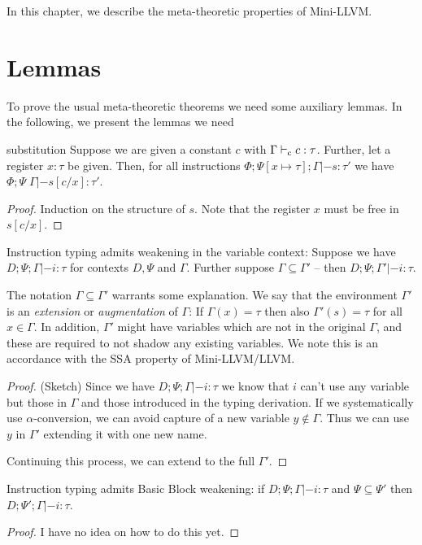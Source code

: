 \documentclass[a4paper, oneside, 10pt, draft]{memoir}
\begin{document}
In this chapter, we describe the meta-theoretic properties of
Mini-LLVM.

\section{Lemmas}

To prove the usual meta-theoretic theorems we need some auxiliary
lemmas. In the following, we present the lemmas we need

\begin{lem}{substitution}
  \label{lem:substitution}
  Suppose we are given a constant $c$ with $\Gamma |-_{\mathrm{c}} c :
  \tau$. Further, let a register $x : \tau$ be given. Then, for all
  instructions $\Phi;\Psi[x \mapsto \tau];\Gamma |- s : \tau'$ we have
  $\Phi;\Psi\;\Gamma |- s[c/x] : \tau'$.
\end{lem}
\begin{proof}
  Induction on the structure of $s$. Note that the register $x$ must
  be free in $s[c/x]$.
\end{proof}

\begin{lem}
  \label{lem:weaken-gamma}
  Instruction typing admits weakening in the variable context: Suppose
  we have $D;\Psi;\Gamma |- i : \tau$ for contexts $D, \Psi$ and
  $\Gamma$. Further suppose $\Gamma \subseteq \Gamma'$ -- then
  $D;\Psi;\Gamma' |- i : \tau$.
\end{lem}
\begin{rem}
  The notation $\Gamma \subseteq \Gamma'$ warrants some
  explanation. We say that the environment $\Gamma'$ is an
  \emph{extension} or \emph{augmentation} of $\Gamma$: If $\Gamma(x) =
  \tau$ then also $\Gamma'(s) = \tau$ for all $x \in \Gamma$. In
  addition, $\Gamma'$ might have variables which are not in the
  original $\Gamma$, and these are required to not shadow any existing
  variables. We note this is an accordance with the SSA property of
  Mini-LLVM/LLVM.
\end{rem}
\begin{proof}(Sketch)
  Since we have $D;\Psi;\Gamma |- i : \tau$ we know that $i$ can't use
  any variable but those in $\Gamma$ and those introduced in the
  typing derivation. If we systematically use $\alpha$-conversion, we
  can avoid capture of a new variable $y \not \in \Gamma$. Thus we can
  use $y$ in $\Gamma'$ extending it with one new name.

  Continuing this process, we can extend to the full $\Gamma'$.
\end{proof}
\begin{lem}
  \label{lem:weaken-psi}
  Instruction typing admits Basic Block weakening: if $D;\Psi;\Gamma
  |- i : \tau$ and $\Psi \subseteq \Psi'$ then $D;\Psi';\Gamma |- i :
  \tau$.
\end{lem}
\begin{proof}
  I have no idea on how to do this yet.
\end{proof}
\end{document}
